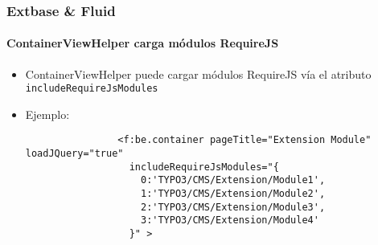 
\begin{frame}[fragile]
	\frametitle{Extbase \& Fluid}
	\framesubtitle{ContainerViewHelper carga módulos RequireJS}

	\begin{itemize}

		\item ContainerViewHelper puede cargar módulos RequireJS vía el atributo \texttt{includeRequireJsModules}

		\item Ejemplo:

			\begin{lstlisting}
				<f:be.container pageTitle="Extension Module" loadJQuery="true"
				  includeRequireJsModules="{
				    0:'TYPO3/CMS/Extension/Module1',
				    1:'TYPO3/CMS/Extension/Module2',
				    2:'TYPO3/CMS/Extension/Module3',
				    3:'TYPO3/CMS/Extension/Module4'
				  }" >
			\end{lstlisting}

	\end{itemize}

\end{frame}


